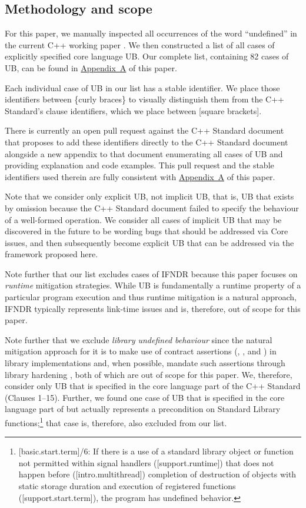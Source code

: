 \subsection{Methodology and scope}

For this paper, we manually inspected all occurrences of the word ``undefined'' in the current C++ working paper \cite{N5008}. We then constructed a list of all cases of explicitly specified core language UB. Our complete list, containing 82 cases of UB, can be found in \hyperref[appendix]{Appendix~A} of this paper. 

Each individual case of UB in our list has a stable identifier. We place those identifiers between \{curly braces\} to visually distinguish them from the C++ Standard's clause identifiers, which we place between [square brackets]. 

There is currently an open pull request against the C++ Standard document that proposes to add these identifiers directly to the C++ Standard document alongside a new appendix to that document enumerating all cases of UB and providing explanation and code examples. This pull request and the stable identifiers used therein are fully consistent with \hyperref[appendix]{Appendix~A} of this paper. 

Note that we consider only explicit UB, not implicit UB, that is, UB that exists by omission because the C++ Standard document failed to specify the behaviour of a well-formed operation. We consider all cases of implicit UB that may be discovered in the future to be wording bugs that should be addressed via Core issues, and then subsequently become explicit UB that can be addressed  via the framework proposed here.

Note further that our list excludes cases of IFNDR because this paper focuses on \emph{runtime} mitigation strategies. While UB is fundamentally a runtime property of a particular program execution and thus runtime mitigation is a natural approach, IFNDR typically represents link-time issues and is, therefore, out of scope for this paper. 

Note further that we exclude \emph{library undefined behaviour} since the natural mitigation approach for it is to make use of contract assertions (, , and ) in library implementations and, when possible, mandate such assertions through library hardening \cite{P3471R4}, both of which are out of scope for this paper. We, therefore, consider only UB that is specified in the core language part of the C++ Standard (Clauses 1--15). Further, we found one case of UB that is specified in the core language part of \cite{N5008} but actually represents a precondition on Standard Library functions;\footnote{[basic.start.term]/6: If there is a use of a standard library object or function not permitted within signal handlers ([support.runtime]) that does not happen before ([intro.multithread]) completion of destruction of objects with static storage duration and execution of  registered functions ([support.start.term]), the program has undefined behavior.}
that case is, therefore, also excluded from our list.

